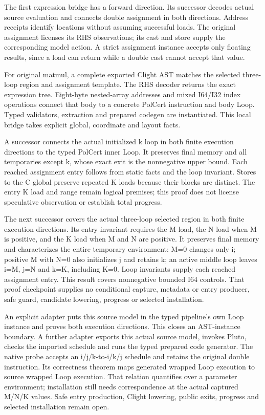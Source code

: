 The first expression bridge has a forward direction. Its successor decodes
actual source evaluation and connects double assignment in both directions.
Address receipts identify locations without assuming successful loads. The
original assignment licenses its RHS observations; its cast and store supply
the corresponding model action. A strict assignment instance accepts only
floating results, since a load can return  while a double cast
cannot accept that value.

For original matmul, a complete exported Clight AST matches the selected
three-loop region and assignment template. The RHS decoder returns the exact
expression tree. Eight-byte nested-array addresses and mixed I64/I32 index
operations connect that body to a concrete PolCert instruction and body Loop.
Typed validators, extraction and prepared codegen are instantiated. This local
bridge takes explicit global, coordinate and layout facts.

A successor connects the actual initialized k loop in both finite execution
directions to the typed PolCert inner Loop. It preserves final memory and
all temporaries except k, whose exact exit is the nonnegative upper bound.
Each reached assignment entry follows from static facts and the loop
invariant. Stores to the C global preserve repeated K loads because their
blocks are distinct. The entry K load and range remain logical premises;
this proof does not license speculative observation or establish total
progress.

The next successor covers the actual three-loop selected region in both
finite execution directions. Its entry invariant requires the M load,
the N load when M is positive, and the K load when M and N are positive.
It preserves final memory and characterizes the entire temporary environment:
M=0 changes only i; positive M with N=0 also initializes j and retains k;
an active middle loop leaves i=M, j=N and k=K, including K=0.
Loop invariants supply each reached assignment entry. This result covers
nonnegative bounded I64 controls. That proof checkpoint supplies no conditional
capture, metadata or entry producer, safe guard, candidate lowering, progress
or selected installation.

An explicit adapter puts this source model in the typed pipeline's own Loop
instance and proves both execution directions. This closes an AST-instance
boundary. A further adapter exports this actual source model, invokes Pluto,
checks the imported schedule and runs the typed prepared code generator.
The native probe accepts an i/j/k-to-i/k/j schedule and retains the original
double instruction. Its correctness theorem maps generated wrapped Loop
execution to source wrapped Loop execution. That relation quantifies over a
parameter environment; installation still needs correspondence at the actual
captured M/N/K values. Safe entry production, Clight lowering, public exits,
progress and selected installation remain open.

